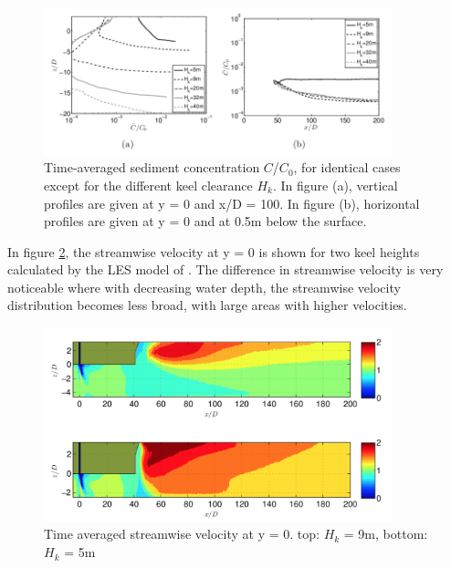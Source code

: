 \begin{figure}[ht!]
    \centering
    \includegraphics[width = 0.9\textwidth]{Images/depth_belg.png}
    \caption{Time-averaged sediment concentration $C$/$C_0$, for identical cases except for the different keel clearance $H_k$. In figure (a), vertical profiles are given at y = 0 and x/D = 100. In figure (b), horizontal profiles are given at y = 0 and at 0.5m below the surface.}
    \label{fig:depth_belg}
\end{figure}

\noindent In figure \ref{fig:depth_belg_2}, the streamwise velocity at y = 0 is shown for two keel heights calculated by the LES model of \cite{Decrop}. The difference in streamwise velocity is very noticeable where with decreasing water depth, the streamwise velocity distribution becomes less broad, with large areas with higher velocities.

\begin{figure}[ht!]
    \centering
    \includegraphics[width = 0.9\textwidth]{Images/depth_velocity_belg.png}
    \caption{Time averaged streamwise velocity at y = 0. top: $H_k$ = 9m, bottom: $H_k$ = 5m}
    \label{fig:depth_belg_2}
\end{figure}



